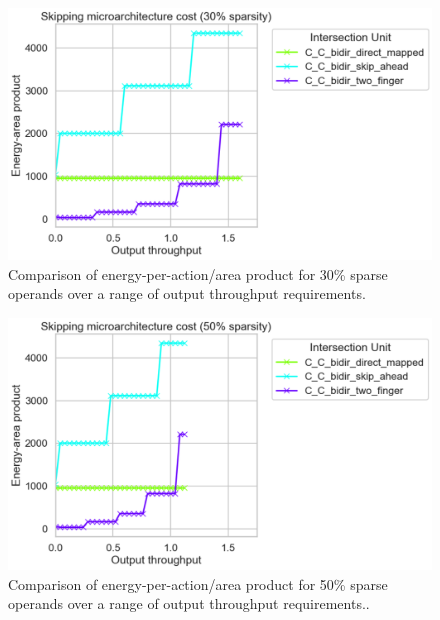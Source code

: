 \begin{figure}[H]
\includegraphics[width=\textwidth]{figures/skip_uarch_sparsity_30pct.png}
\caption{Comparison of energy-per-action/area product for 30\% sparse operands over a range of output throughput requirements.}
\label{fig:skip_uarch_sparsity_30pct}
\end{figure}

\begin{figure}[H]
\includegraphics[width=\textwidth]{figures/skip_uarch_sparsity_50pct.png}
\caption{Comparison of energy-per-action/area product for 50\% sparse operands over a range of output throughput requirements..}
\label{fig:skip_uarch_sparsity_50pct}
\end{figure}

